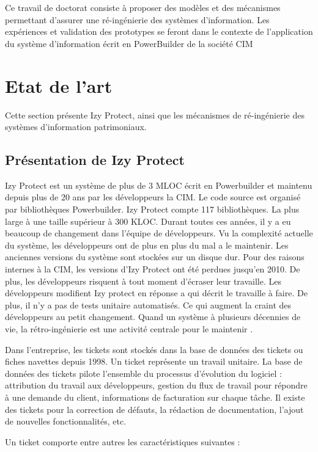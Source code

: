 \documentclass[a4paper]{article}
\begin{document}
Ce travail de doctorat consiste à proposer des modèles et des mécanismes permettant d'assurer une ré-ingénierie des systèmes d'information. Les expériences et validation des prototypes se feront dans le contexte de l'application du système d'information écrit en PowerBuilder de la société CIM


\section{Etat de l'art}
\label{sec:stateOfTheArt}

Cette section présente Izy Protect, ainsi que les mécanismes de ré-ingénierie des systèmes d'information patrimoniaux.
\subsection{Présentation de Izy Protect}
\label{sec:izyProtect}
Izy Protect est un système de plus de 3 MLOC écrit en Powerbuilder et maintenu depuis plus de 20 ans par les développeurs la CIM. Le code source est organisé par bibliothèques Powerbuilder. 
Izy Protect compte 117 bibliothèques. La plus large à une taille supérieur à 300 KLOC.
Durant toutes ces années, il y a eu beaucoup de changement dans l'équipe de développeurs. 
Vu la complexité actuelle du système, les développeurs ont de plus en plus du mal a le maintenir.
Les anciennes versions du système sont stockées sur un disque dur. Pour des raisons internes à la CIM, les versions d'Izy Protect ont été perdues jusqu'en 2010. De plus, les développeurs risquent à tout moment d'écraser leur travaille. Les développeurs modifient Izy protect en réponse a qui décrit le travaille à faire. 
De plus, il n'y a pas de tests unitaire automatisés.
Ce qui augment la craint des développeurs au petit changement. 
Quand un système à plusieurs décennies de vie, la rétro-ingénierie est une activité centrale pour le maintenir \cite{Deme02a}.

Dans l'entreprise, les tickets sont stockés dans la base de données des tickets ou fiches navettes depuis 1998. 
Un ticket représente un travail unitaire.
La base de données des tickets pilote l'ensemble du processus d'évolution du logiciel : attribution du travail aux développeurs, gestion du flux de travail pour répondre à une demande du client, informations de facturation sur chaque tâche.
Il existe des tickets pour la correction de défauts, la rédaction de documentation, l'ajout de nouvelles fonctionnalités, etc. 

Un ticket comporte entre autres les caractéristiques suivantes :
\end{document}
